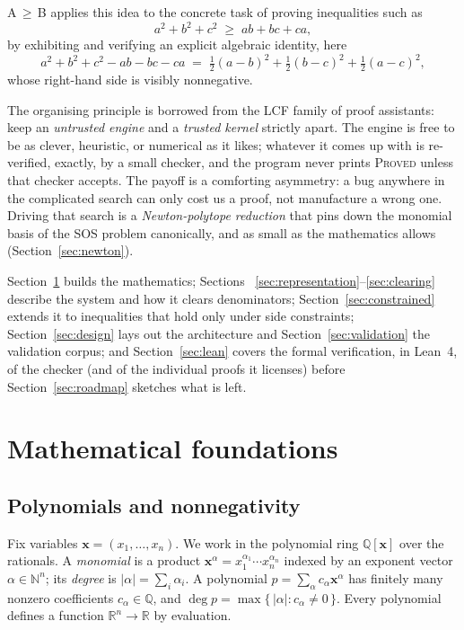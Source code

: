 \documentclass[11pt]{article}
\theoremstyle{definition}
\theoremstyle{plain}
\newcommand{\R}{\mathbb{R}}
\newcommand{\Q}{\mathbb{Q}}
\newcommand{\N}{\mathbb{N}}
\newcommand{\x}{\mathbf{x}}
\begin{document}
A\,$\ge$\,B applies this idea to the concrete task of proving inequalities such
as
\[
  a^2 + b^2 + c^2 \;\ge\; ab + bc + ca ,
\]
by exhibiting and verifying an explicit algebraic identity, here
\[
  a^2 + b^2 + c^2 - ab - bc - ca
  \;=\; \tfrac12(a-b)^2 + \tfrac12(b-c)^2 + \tfrac12(a-c)^2 ,
\]
whose right-hand side is visibly nonnegative.

The organising principle is borrowed from the LCF family of proof assistants:
keep an \emph{untrusted engine} and a \emph{trusted kernel} strictly apart. The
engine is free to be as clever, heuristic, or numerical as it likes; whatever it
comes up with is re-verified, exactly, by a small checker, and the program never
prints \textsc{Proved} unless that checker accepts. The payoff is a comforting
asymmetry: a bug anywhere in the complicated search can only cost us a proof, not
manufacture a wrong one. Driving that search is a \emph{Newton-polytope
reduction} that pins down the monomial basis of the SOS problem canonically, and
as small as the mathematics allows (Section~\ref{sec:newton}).

Section~\ref{sec:foundations} builds the mathematics; Sections~%
\ref{sec:representation}--\ref{sec:clearing} describe the system and how it
clears denominators; Section~\ref{sec:constrained} extends it to inequalities
that hold only under side constraints; Section~\ref{sec:design} lays out the
architecture and Section~\ref{sec:validation} the validation corpus; and
Section~\ref{sec:lean} covers the formal verification, in Lean~4, of the
checker (and of the individual proofs it licenses) before
Section~\ref{sec:roadmap} sketches what is left.

\section{Mathematical foundations}
\label{sec:foundations}

\subsection{Polynomials and nonnegativity}

Fix variables $\x = (x_1,\dots,x_n)$. We work in the polynomial ring $\Q[\x]$
over the rationals. A \emph{monomial} is a product $\x^{\alpha} =
x_1^{\alpha_1}\cdots x_n^{\alpha_n}$ indexed by an exponent vector $\alpha \in
\N^n$; its \emph{degree} is $|\alpha| = \sum_i \alpha_i$. A polynomial $p =
\sum_{\alpha} c_\alpha \x^{\alpha}$ has finitely many nonzero coefficients
$c_\alpha \in \Q$, and $\deg p = \max\{\,|\alpha| : c_\alpha \neq 0\,\}$. Every
polynomial defines a function $\R^n \to \R$ by evaluation.
\end{document}
